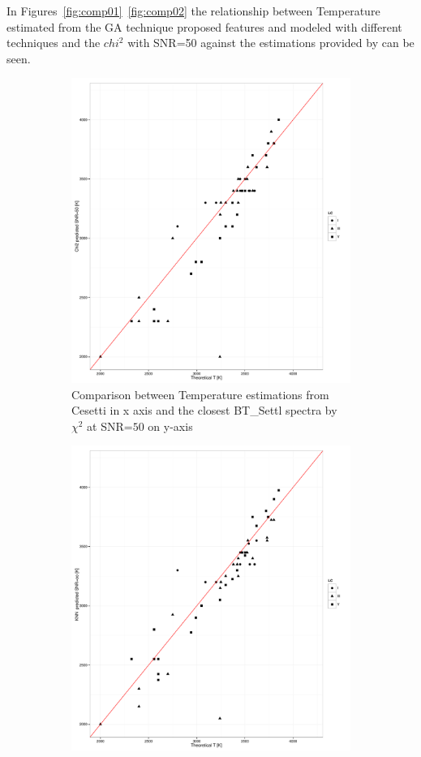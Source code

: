 In Figures~\ref{fig:comp01}~\ref{fig:comp02} the relationship between
Temperature estimated from the GA technique proposed features and
modeled with different techniques and the $chi^2$ with SNR=50 against
the estimations provided by \cite{cesetti} can be seen.

\begin {figure}
 \centering
 \begin{subfigure}{.85\textwidth}
  \centering
  \includegraphics[width=11cm]{figs/irtf_T_chi250_Cesetti.pdf}
  \caption{Comparison between Temperature estimations from Cesetti 
  in x axis and the closest BT\_Settl spectra by $\chi^2$ at SNR=$50$ on y-axis}
 \label{fig:chi2_50_spt}
 \end{subfigure}
  \begin{subfigure}{.85\textwidth}
  \centering
  \includegraphics[width=11cm]{figs/irtf_T_knnoo_Cesetti.pdf}

\end{subfigure}
\end{figure}
